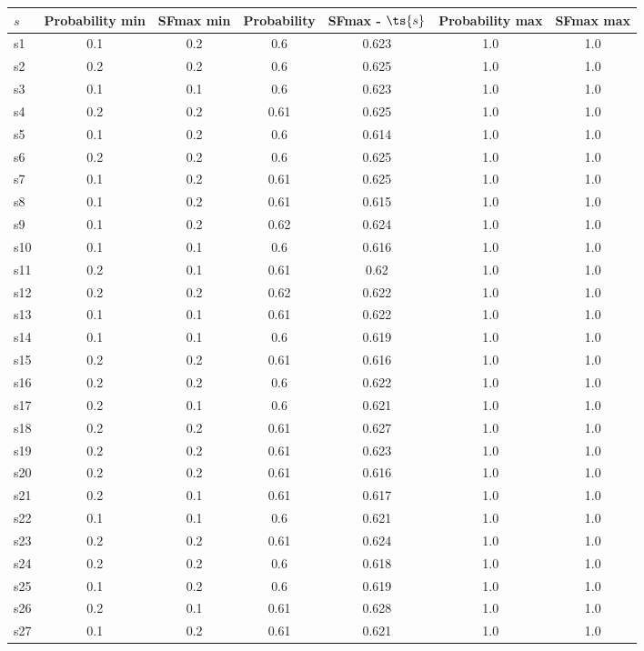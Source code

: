 \documentclass{article}
\begin{document}
\noindent\begin{tabular}{|l|c|c|c|c|c|c|}
\hline
$s$& Probability min & SFmax min & Probability & SFmax - $\ts{s}$ & Probability max & SFmax max\\
\hline
s1 &0.1 & 0.2 & 0.6 & 0.623 & 1.0 & 1.0\\
\hline
s2 &0.2 & 0.2 & 0.6 & 0.625 & 1.0 & 1.0\\
\hline
s3 &0.1 & 0.1 & 0.6 & 0.623 & 1.0 & 1.0\\
\hline
s4 &0.2 & 0.2 & 0.61 & 0.625 & 1.0 & 1.0\\
\hline
s5 &0.1 & 0.2 & 0.6 & 0.614 & 1.0 & 1.0\\
\hline
s6 &0.2 & 0.2 & 0.6 & 0.625 & 1.0 & 1.0\\
\hline
s7 &0.1 & 0.2 & 0.61 & 0.625 & 1.0 & 1.0\\
\hline
s8 &0.1 & 0.2 & 0.61 & 0.615 & 1.0 & 1.0\\
\hline
s9 &0.1 & 0.2 & 0.62 & 0.624 & 1.0 & 1.0\\
\hline
s10 &0.1 & 0.1 & 0.6 & 0.616 & 1.0 & 1.0\\
\hline
s11 &0.2 & 0.1 & 0.61 & 0.62 & 1.0 & 1.0\\
\hline
s12 &0.2 & 0.2 & 0.62 & 0.622 & 1.0 & 1.0\\
\hline
s13 &0.1 & 0.1 & 0.61 & 0.622 & 1.0 & 1.0\\
\hline
s14 &0.1 & 0.1 & 0.6 & 0.619 & 1.0 & 1.0\\
\hline
s15 &0.2 & 0.2 & 0.61 & 0.616 & 1.0 & 1.0\\
\hline
s16 &0.2 & 0.2 & 0.6 & 0.622 & 1.0 & 1.0\\
\hline
s17 &0.2 & 0.1 & 0.6 & 0.621 & 1.0 & 1.0\\
\hline
s18 &0.2 & 0.2 & 0.61 & 0.627 & 1.0 & 1.0\\
\hline
s19 &0.2 & 0.2 & 0.61 & 0.623 & 1.0 & 1.0\\
\hline
s20 &0.2 & 0.2 & 0.61 & 0.616 & 1.0 & 1.0\\
\hline
s21 &0.2 & 0.1 & 0.61 & 0.617 & 1.0 & 1.0\\
\hline
s22 &0.1 & 0.1 & 0.6 & 0.621 & 1.0 & 1.0\\
\hline
s23 &0.2 & 0.2 & 0.61 & 0.624 & 1.0 & 1.0\\
\hline
s24 &0.2 & 0.2 & 0.6 & 0.618 & 1.0 & 1.0\\
\hline
s25 &0.1 & 0.2 & 0.6 & 0.619 & 1.0 & 1.0\\
\hline
s26 &0.2 & 0.1 & 0.61 & 0.628 & 1.0 & 1.0\\
\hline
s27 &0.1 & 0.2 & 0.61 & 0.621 & 1.0 & 1.0\\

\end{tabular}
\end{document}
